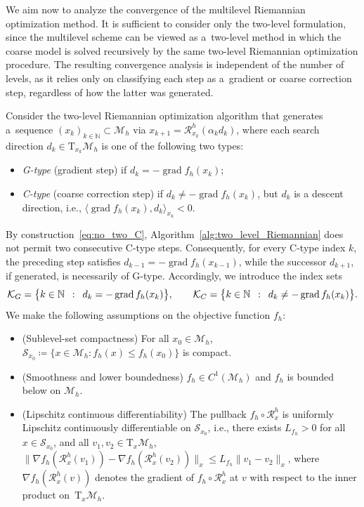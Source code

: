 \documentclass[11pt,reqno]{amsart}
\theoremstyle{plain}
\newcommand\N{\mathbb N}
\DeclareMathOperator{\grad}{grad}
\newcommand\calK{\mathcal K}
\newcommand{\M}{\mathcal{M}}
\newcommand{\Tan}{\mathrm{T}}
\newcommand{\Ret}{\mathcal R}
\begin{document}
	We aim now to analyze the convergence of the multilevel Riemannian optimization method. It is sufficient to consider only the two-level formulation, since the multilevel scheme can be viewed as a~two-level method in which the coarse model is solved recursively by the same two-level Riemannian optimization procedure. The resulting convergence analysis is independent of the number of levels, as it relies only on classifying each step as a~gradient or coarse correction step, regardless of how the latter was generated.
	
	Consider the two-level Riemannian optimization algorithm that generates a~sequence \linebreak\mbox{$(x_k)_{k \in \N} \subset \M_h$} via $x_{k+1} = \Ret_{x_k}^h(\alpha_k d_k)$, where each search direction $d_k \in \Tan_{x_k}\M_h$ is one of the following two types:
	\begin{itemize}[leftmargin=2em]
		\item \emph{G-type} (gradient step) if $d_k = -\grad f_h(x_k)$;
		\item \emph{C-type} (coarse correction step) if 
		$d_k \neq -\grad f_h(x_k)$, but $d_k$ is a descent direction, i.e., $\langle \grad f_h(x_k), d_k\rangle_{x_k} < 0$.
	\end{itemize}
	By construction~\eqref{eq:no_two_C}, Algorithm~\ref{alg:two_level_Riemannian} does not permit two consecutive C-type steps. Consequently, for every C-type index $k$, the preceding step satisfies $d_{k-1}=-\grad f_h(x_{k-1})$, while the successor $d_{k+1}$, if generated, is necessarily of G-type. Accordingly, we introduce the index sets
	\[
	\calK_G = \big\{ k\in\N \enskip : \enskip d_k = -\grad f_h(x_k) \big\}, \qquad
	\calK_C = \big\{ k\in\N \enskip : \enskip d_k \neq -\grad f_h(x_k) \big\}.
	\]
	We make the following assumptions on the objective function $f_h$:
	\begin{itemize}[itemsep=0.2em]
		\item[\bf{A1:}] (Sublevel-set compactness) For all $x_0 \in \M_h$, 
		$\mathcal S_{x_0} \coloneqq \{x \in \M_h : f_h(x) \le f_h(x_0)\}$ is compact.
		\item[\bf{A2:}] (Smoothness and lower boundedness) $f_h \in C^1(\M_h)$ and $f_h$ is bounded below on $\M_h$.
		\item[\bf{A3:}] (Lipschitz continuous differentiability) 
		The pullback $f_h\circ \Ret_x^h$ is uniformly Lipschitz continuously differentiable on $\mathcal S_{x_0}$, i.e., there exists $L_{f_h}>0$ for all $x \in \mathcal S_{x_0}$,  
		and all $v_1,v_2\in \Tan_x\M_h$, $\|\nabla f_h(\Ret_x^h(v_1)) - \nabla 
		f_h(\Ret_x^h(v_2))\|_{x} \le L_{f_h}\|v_1-v_2\|_x$, where 
		$\nabla f_h(\Ret_x^h(v))$ denotes the gradient of $f_h\circ \Ret_x^h$ at $v$ with respect to the inner product on~$\Tan_x\M_h$.
	\end{itemize}
\end{document}
